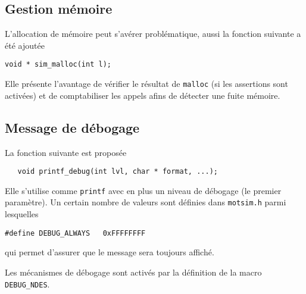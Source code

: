 %
\subsection{Gestion mémoire}

   L'allocation de mémoire peut s'avérer problématique, aussi la
fonction suivante a été ajoutée

\begin{verbatim}
void * sim_malloc(int l);
\end{verbatim}

   Elle présente l'avantage de vérifier le résultat de {\tt malloc}
(si les assertions sont activées) et de comptabiliser les appels afins
de détecter une fuite mémoire.

%
\subsection{Message de débogage}

   La fonction suivante est proposée 

\begin{verbatim}
   void printf_debug(int lvl, char * format, ...);
\end{verbatim}

   Elle s'utilise comme {\tt printf} avec en plus un niveau de
débogage (le premier paramètre). Un certain nombre de valeurs sont
définies dans {\tt motsim.h} parmi lesquelles

\begin{verbatim}
#define DEBUG_ALWAYS   0xFFFFFFFF
\end{verbatim}

   qui permet d'assurer que le message sera toujours affiché.

   Les mécanismes de débogage sont activés par la définition de la
macro {\tt DEBUG\_NDES}.


